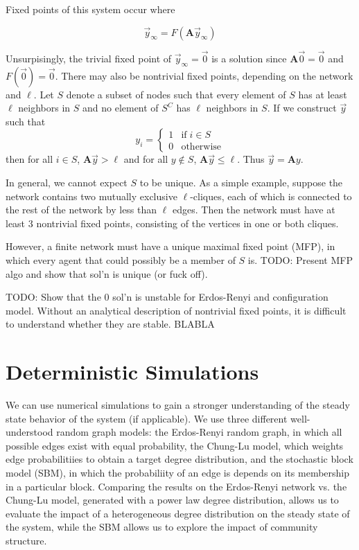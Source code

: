 \documentclass[12pt]{article}
\begin{document}
Fixed points of this system occur where

\begin{equation}
  \vec{y}_{\infty} = F(\mathbf{A}\vec{y}_{\infty})
\end{equation}

Unsurpisingly, the trivial fixed point of $\vec{y}_{\infty} = \vec{0}$ is a solution since $\mathbf{A}\vec{0} = \vec{0}$ and $F(\vec{0}) = \vec{0}$.  There may also be nontrivial fixed points, depending on the network and $\ell$.  Let $S$ denote a subset of nodes such that every element of $S$ has at least $\ell$ neighbors in $S$ and no element of $S^C$ has $\ell$ neighbors in $S$.  If we construct $\vec{y}$ such that  
\begin{equation}
  y_i = \begin{cases}
    1 &\text{if} \; i \in S \\
    0 &\text{otherwise}
  \end{cases}
\end{equation}
 then for all $i \in S$, $\mathbf{A}\vec{y} > \ell$ and for all $y \notin S$, $\mathbf{A}\vec{y} \leq \ell$.  Thus $\vec{y} = \mathbf{A}y$. 

In general, we cannot expect $S$ to be unique.  As a simple example, suppose the network contains two mutually exclusive $\ell$-cliques, each of which is connected to the rest of the network by less than $\ell$ edges.  Then the network must have at least 3 nontrivial fixed points, consisting of the vertices in one or both cliques.

However, a finite network must have a unique maximal fixed point (MFP), in which every agent that could possibly be a member of $S$ is.  
TODO: Present MFP algo and show that sol'n is unique (or fuck off). 

TODO: Show that the 0 sol'n is unstable for Erdos-Renyi and configuration model.  Without an analytical description of nontrivial fixed points, it is difficult to understand whether they are stable.  BLABLA  

\section{Deterministic Simulations}
We can use numerical simulations to gain a stronger understanding of the steady state behavior of the system (if applicable).  We use three different well-understood random graph models: the Erdos-Renyi random graph, in which all possible edges exist with equal probability, the Chung-Lu model, which weights edge probabilitiies to obtain a target degree distribution, and the stochastic block model (SBM), in which the probabiliity of an edge is depends on its membership in a particular block.  Comparing the results on the Erdos-Renyi network vs. the Chung-Lu model, generated with a power law degree distribution, allows us to evaluate the impact of a heterogeneous degree distribution on the steady state of the system, while the SBM allows us to explore the impact of community structure.
\end{document}
